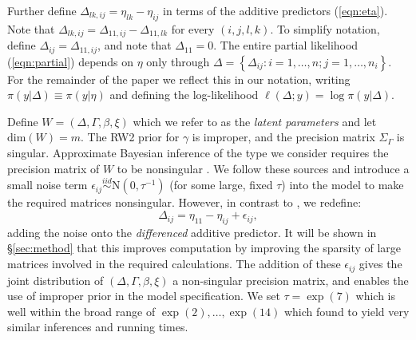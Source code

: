 \documentclass[ba]{imsart}
\begin{document}
Further define $\Delta_{lk,ij} = \eta_{lk} - \eta_{ij}$ in terms of the additive predictors (\ref{eqn:eta}). Note that $\Delta_{lk,ij} = \Delta_{11,ij} - \Delta_{11,lk}$ for every $(i,j,l,k)$. To simplify notation, define $\Delta_{ij} = \Delta_{11,ij}$, and note that $\Delta_{11} = 0$. The entire partial likelihood (\ref{eqn:partial}) depends on $\eta$ only through  $\Delta = \left\{\Delta_{ij}: i = 1,\ldots,n; j = 1,\ldots,n_{i} \right\}$. For the remainder of the paper we reflect this in our notation, writing $\pi(y|\Delta) \equiv \pi(y|\eta)$ and defining the log-likelihood $\ell(\Delta; y) = \log\pi(y|\Delta)$.

Define $W = \left(\Delta, \Gamma,\beta, \xi \right)$ which we refer to as the \textit{latent parameters} and let $\text{dim}(W) = m$. The RW2 prior for $\gamma$ is improper, and the precision matrix $\Sigma_{\Gamma}$ is singular. Approximate Bayesian inference of the type we consider requires the precision matrix of $W$ to be nonsingular \citep{inla,inlacoxph,casecross}. We follow these sources and introduce a small noise term $\epsilon_{ij} \stackrel{iid}{\sim} \text{N}(0,\tau^{-1})$ (for some large, fixed $\tau$) into the model to make the required matrices nonsingular. However, in contrast to \citet{casecross}, we redefine:
\begin{equation}
\Delta_{ij} = \eta_{11} - \eta_{ij} + \epsilon_{ij},
\end{equation}
adding the noise onto the \emph{differenced} additive predictor. It will be shown in \S\ref{sec:method} that this improves computation by improving the sparsity of large matrices involved in the required calculations. The addition of these $\epsilon_{ij}$ gives the joint distribution of $\left(\Delta, \Gamma,\beta, \xi \right)$ a non-singular precision matrix, and enables the use of improper prior in the model specification. We set $\tau = \exp(7)$ which is well within the broad range of $\exp(2),\ldots,\exp(14)$ which \cite{casecross} found to yield very similar inferences and running times. 
\end{document}
